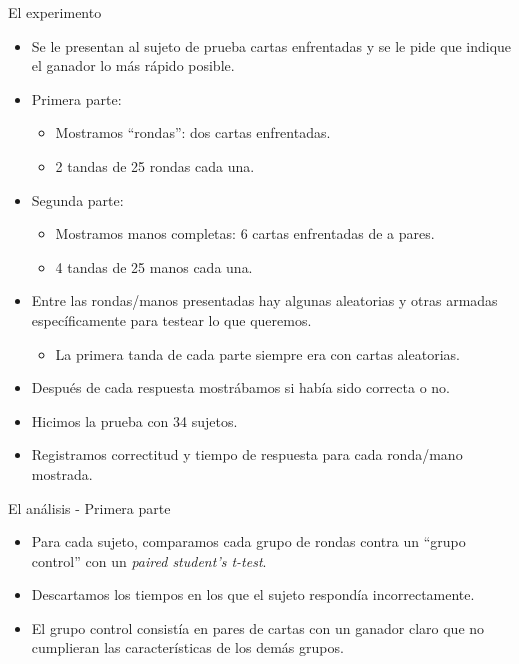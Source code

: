 \documentclass{beamer}
\begin{document}
\begin{frame}{El experimento}
\begin{itemize}

\item Se le presentan al sujeto de prueba cartas enfrentadas y se le pide que indique el ganador lo más rápido posible.
\pause
\item Primera parte:
  \begin{itemize}
  \item Mostramos ``rondas'': dos cartas enfrentadas.
  \item 2 tandas de 25 rondas cada una.
  \end{itemize}
\item Segunda parte:
  \begin{itemize}
  \item Mostramos manos completas: 6 cartas enfrentadas de a pares.
  \item 4 tandas de 25 manos cada una.
  \end{itemize}
\pause
\item Entre las rondas/manos presentadas hay algunas aleatorias y otras armadas específicamente para testear lo que queremos.
  \begin{itemize}
  \item La primera tanda de cada parte siempre era con cartas aleatorias.
  \end{itemize}
\item Después de cada respuesta mostrábamos si había sido correcta o no.
\item Hicimos la prueba con 34 sujetos.
\item Registramos correctitud y tiempo de respuesta para cada ronda/mano mostrada.
\end{itemize}
\end{frame}


\begin{frame}{El análisis - Primera parte}
\begin{itemize}
\item Para cada sujeto, comparamos cada grupo de rondas contra un ``grupo control'' con un \textit{paired student's t-test}.
\item Descartamos los tiempos en los que el sujeto respondía incorrectamente.
\item El grupo control consistía en pares de cartas con un ganador claro que no cumplieran las características de los demás grupos.
\end{itemize}
\end{frame}
\end{document}

